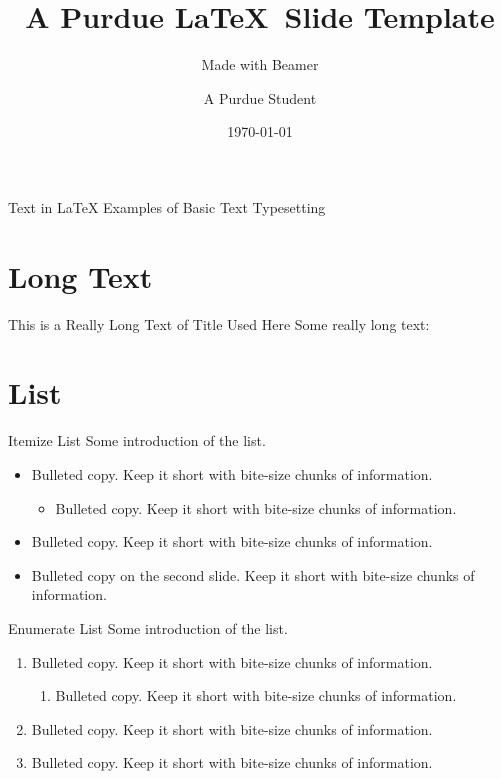 \documentclass{purdue-slide}
\title{A Purdue \LaTeX\ Slide Template}
\subtitle{Made with Beamer}
\author{A Purdue Student}
\institute{Purdue University}
\date{\today}
\begin{document}
\begin{titleframe}{}
    \maketitle
\end{titleframe}

\begin{titleframe}{Text in \LaTeX}
    Examples of Basic Text Typesetting
\end{titleframe}

\section{Long Text}

\begin{frame}{This is a Really Long Text of Title Used Here}
    Some really long text:
    
    \vspace{\baselineskip}
    
    \lipsum[2]
\end{frame}

\section{List}

\begin{frame}{Itemize List}
    Some introduction of the list.
    \begin{itemize}
        \item Bulleted copy. Keep it short with bite-size chunks of information.
        \begin{itemize}
            \item Bulleted copy. Keep it short with bite-size chunks of information.
        \end{itemize}
        \item Bulleted copy. Keep it short with bite-size chunks of information.
        \pause\item Bulleted copy on the second slide. Keep it short with bite-size chunks of information.
    \end{itemize}
\end{frame}

\begin{frame}{Enumerate List}
    Some introduction of the list.
    \begin{enumerate}
        \item Bulleted copy. Keep it short with bite-size chunks of information.
        \begin{enumerate}
            \item Bulleted copy. Keep it short with bite-size chunks of information.
        \end{enumerate}
        \item Bulleted copy. Keep it short with bite-size chunks of information.
        \item Bulleted copy. Keep it short with bite-size chunks of information.
    \end{enumerate}
\end{frame}
\end{document}
